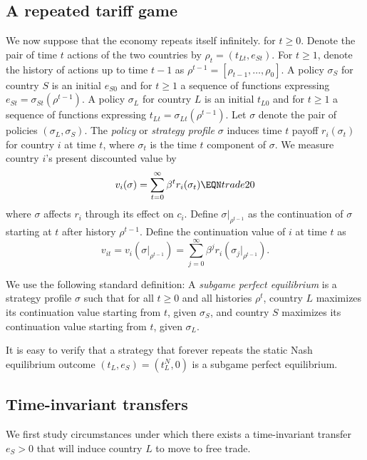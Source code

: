\subsection{A repeated tariff game}

We now suppose that the economy repeats itself infinitely.
for $t \geq 0$.
Denote the pair of time $t$ actions of the
two countries by $\rho_t= (t_{Lt},  e_{St})$.  For $t \geq 1$, denote
the history of actions up to time $t-1$
as $\rho^{t-1} = [\rho_{t-1}, \ldots, \rho_0]$.
A policy $\sigma_{S}$ for country $S$ is an initial $e_{S0}$ and for $t\geq 1$
a sequence of functions expressing $e_{St}= \sigma_{St}(\rho^{t-1})$.
A policy $\sigma_{L}$
for country $L$ is an initial $t_{L0}$ and for $t\geq 1$
a sequence of functions expressing $t_{Lt}= \sigma_{Lt}(\rho^{t-1})$.
Let $\sigma$ denote the pair of policies $(\sigma_{L},  \sigma_S)$.
The {\it policy\/} or {\it strategy profile\/}
 $\sigma$ induces time $t$ payoff
$r_i(\sigma_t)$ for country
$i$ at time $t$, where $\sigma_t$ is the time $t$ component of
$\sigma$.
We measure country
$i$'s present discounted   value by
$$ v_i(\sigma) = \sum_{t=0}^\infty \beta^t r_i(\sigma_t) \EQN trade20 $$
where $\sigma$ affects $r_i$ through its effect on $c_i$.
Define $\sigma|_{\rho^{t-1}}$ as the continuation of $\sigma$ starting at
$t$  after
history  $\rho^{t-1}$.
Define the continuation value of $i$ at time $t$ as
$$ v_{it} = v_i(\sigma|_{\rho^{t-1}}) =
 \sum_{j=0}^\infty \beta^j r_i(\sigma_j|_{\rho^{t-1}}). $$

We use the following standard definition:
\medskip
{}
A {\it subgame perfect equilibrium\/} is a strategy profile $\sigma$
such that for all $t\geq 0$ and all histories $\rho^t$, country
$L$ maximizes its continuation value starting from $t$, given
$\sigma_S$, and country $S$  maximizes its continuation    value
starting from $t$, given $\sigma_{L}$.
\medskip

It is easy to verify that a strategy that forever repeats the
static Nash equilibrium outcome $(t_L, e_S)= (t_L^N, 0)$ is
a subgame perfect equilibrium.


\subsection{Time-invariant transfers}

We first study circumstances under which
there exists a time-invariant transfer
$e_S >0$ that will induce country $L$ to move  to free trade.



